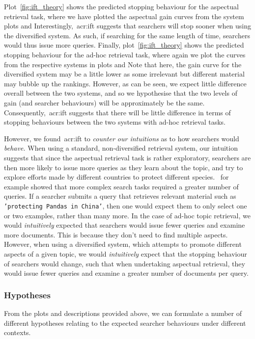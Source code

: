 Plot~\ref{fig:ift_theory}  shows the predicted stopping behaviour for the aspectual retrieval task, where we have plotted the aspectual gain curves from the system plots  and  Interestingly,~\gls{acr:ift} suggests that searchers will stop sooner when using the diversified system. As such, if searching for the same length of time, searchers would thus issue more queries. Finally, plot~\ref{fig:ift_theory}  shows the predicted stopping behaviour for the ad-hoc retrieval task, where again we plot the curves from the respective systems in plots  and  Note that here, the gain curve for the diversified system may be a little lower as some irrelevant but different material may bubble up the rankings. However, as can be seen, we expect little difference overall between the two systems, and so we hypothesise that the two levels of gain (and searcher behaviours) will be approximately be the same. Consequently,~\gls{acr:ift} suggests that there will be little difference in terms of stopping behaviours between the two systems with ad-hoc retrieval tasks.

However, we found~\gls{acr:ift} to \emph{counter our intuitions} as to how searchers would \emph{behave.} When using a standard, non-diversified retrieval system, our intuition suggests that since the aspectual retrieval task is rather exploratory, searchers are then more likely to issue more queries as they learn about the topic, and try to explore efforts made by different countries to protect different species.~\cite{kelly2015search_tasks} for example showed that more complex search tasks required a greater number of queries. If a searcher submits a query that retrieves relevant material such as \texttt{'protecting Pandas in China'}, then one would expect them to only select one or two examples, rather than many more. In the case of ad-hoc topic retrieval, we would \emph{intuitively} expected that searchers would issue fewer queries and examine more documents. This is because they don't need to find multiple aspects. However, when using a diversified system, which attempts to promote different aspects of a given topic, we would \emph{intuitively} expect that the stopping behaviour of searchers would change, such that when undertaking aspectual retrieval, they would issue fewer queries and examine a greater number of documents per query.

\subsubsection{Hypotheses}\label{sec:diversity:background:tasks:hypotheses}
From the plots and descriptions provided above, we can formulate a number of different hypotheses relating to the expected searcher behaviours under different contexts.

